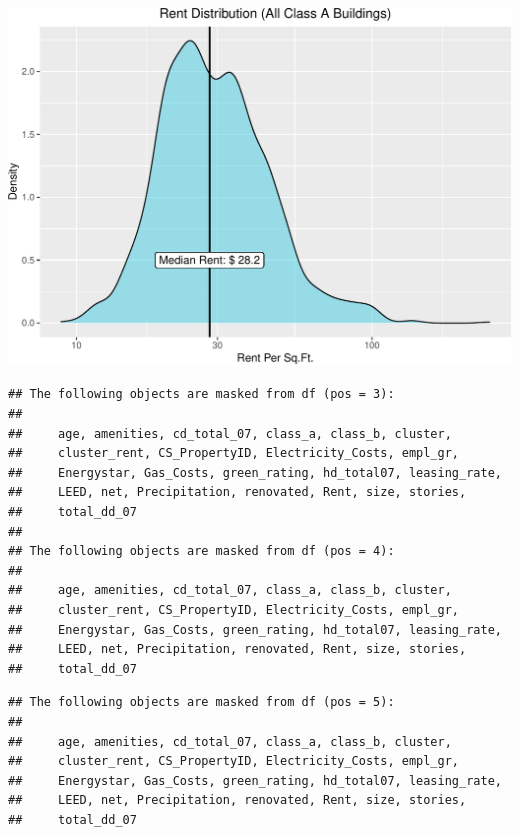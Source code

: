 \documentclass[
]{article}
\begin{document}
\begin{center}\includegraphics{STA380Exercises_Ofunrein_Pflum_Robinson_Vincent_files/figure-latex/unnamed-chunk-7-1} \end{center}

\begin{verbatim}
## The following objects are masked from df (pos = 3):
## 
##     age, amenities, cd_total_07, class_a, class_b, cluster,
##     cluster_rent, CS_PropertyID, Electricity_Costs, empl_gr,
##     Energystar, Gas_Costs, green_rating, hd_total07, leasing_rate,
##     LEED, net, Precipitation, renovated, Rent, size, stories,
##     total_dd_07
## 
## The following objects are masked from df (pos = 4):
## 
##     age, amenities, cd_total_07, class_a, class_b, cluster,
##     cluster_rent, CS_PropertyID, Electricity_Costs, empl_gr,
##     Energystar, Gas_Costs, green_rating, hd_total07, leasing_rate,
##     LEED, net, Precipitation, renovated, Rent, size, stories,
##     total_dd_07
\end{verbatim}

\begin{verbatim}
## The following objects are masked from df (pos = 5):
## 
##     age, amenities, cd_total_07, class_a, class_b, cluster,
##     cluster_rent, CS_PropertyID, Electricity_Costs, empl_gr,
##     Energystar, Gas_Costs, green_rating, hd_total07, leasing_rate,
##     LEED, net, Precipitation, renovated, Rent, size, stories,
##     total_dd_07
\end{verbatim}
\end{document}
